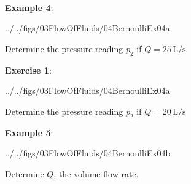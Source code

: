 \documentclass[10pt]{amsart}
\begin{document}
\newpage~
\newpage

\begin{minipage}[t]{0.4\textwidth}
	\raggedright
	\textbf{Example 4}:\\
	\vspace*{-0.5cm}
	\begin{cfig}[0.42]{../../figs/03FlowOfFluids/04BernoulliEx04a}\end{cfig}
	Determine the pressure reading  $p_2$ if $Q=25\,\text{L/s}$
	
	
\end{minipage}
\newpage


\begin{minipage}[t]{0.4\textwidth}
	\raggedright
	\textbf{Exercise 1}:\\
	\vspace*{-0.5cm}
	\begin{cfig}[0.42]{../../figs/03FlowOfFluids/04BernoulliEx04a}\end{cfig}
	Determine the pressure reading  $p_2$ if $Q=20\,\text{L/s}$
	
	
	
\end{minipage}
\newpage

\begin{minipage}[t]{0.42\textwidth}
	\raggedright
	\textbf{Example 5}:\\
	\vspace*{-0.5cm}
	\begin{cfig}[0.4]{../../figs/03FlowOfFluids/04BernoulliEx04b}\end{cfig}
	Determine $Q$, the volume flow rate.
	
	
\end{minipage}

\newpage

\newpage
\end{document}
